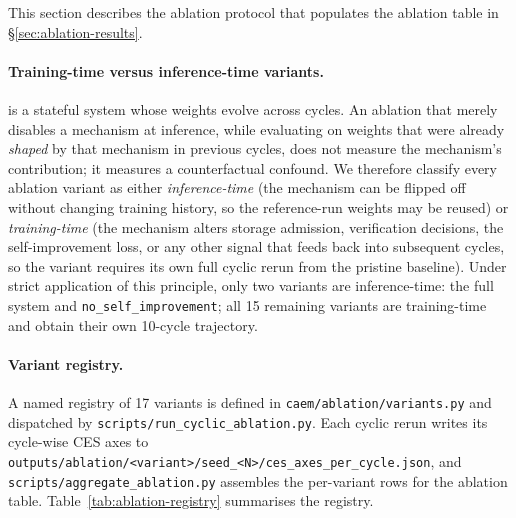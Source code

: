 This section describes the ablation protocol that populates the
ablation table in \S\ref{sec:ablation-results}.

\paragraph{Training-time versus inference-time variants.}
\caem{} is a stateful system whose weights evolve across cycles.
An ablation that merely disables a mechanism at inference, while
evaluating on weights that were already \emph{shaped} by that mechanism
in previous cycles, does not measure the mechanism's contribution;
it measures a counterfactual confound. We therefore classify every
ablation variant as either \emph{inference-time} (the mechanism can be
flipped off without changing training history, so the reference-run
weights may be reused) or \emph{training-time} (the mechanism alters
storage admission, verification decisions, the self-improvement loss,
or any other signal that feeds back into subsequent cycles, so the
variant requires its own full cyclic rerun from the pristine baseline).
Under strict application of this principle, only two variants are
inference-time: the full system and
\texttt{no\_self\_improvement}; all 15 remaining variants are
training-time and obtain their own 10-cycle trajectory.

\paragraph{Variant registry.}
A named registry of 17 variants is defined in
\texttt{caem/ablation/variants.py} and dispatched by
\texttt{scripts/run\_cyclic\_ablation.py}. Each cyclic rerun writes its
cycle-wise CES axes to
\texttt{outputs/ablation/<variant>/seed\_<N>/ces\_axes\_per\_cycle.json},
and \texttt{scripts/aggregate\_ablation.py} assembles the per-variant
rows for the ablation table. Table~\ref{tab:ablation-registry}
summarises the registry.

